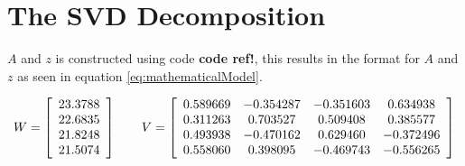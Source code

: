 \section{The SVD Decomposition}

$A$ and $z$ is constructed using code \textbf{code ref!}, this results in the format for $A$ and $z$ as seen in equation \ref{eq:mathematicalModel}.

\begin{equation}
W = 
\left[
\begin{array}{c}
23.3788 \\
22.6835 \\
21.8248 \\
21.5074
\end{array}
\right]
\qquad
V = 
\left[
\begin{array}{c c c c}
0.589669 & -0.354287 & -0.351603 & 0.634938 \\
0.311263 & 0.703527 & 0.509408 & 0.385577 \\
0.493938 & -0.470162 & 0.629460 & -0.372496 \\
0.558060 & 0.398095 & -0.469743 & -0.556265
\end{array}
\right]
\label{eq:W_and_V_computed}
\end{equation}